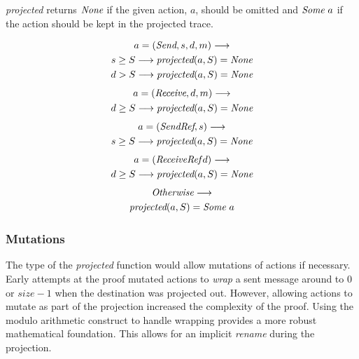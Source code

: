 \documentclass[runningheads]{llncs}
\newcommand{\send}{\emph{Send}}
\newcommand{\receive}{\emph{Receive}}
\newcommand{\sendref}{\emph{SendRef}}
\newcommand{\receiveref}{\emph{ReceiveRef}}
\begin{document}
\emph{projected} returns $\emph{None}$ if the given action, $a$,  should be omitted and $\emph{Some}\ a$ if the action should be kept in the projected trace.

\begin{definition}[projected]
\begin{multline*}
a = (\send, s, d, m) \longrightarrow \\
s \ge S \longrightarrow \emph{projected}(a, S) = \emph{None} \\
d > S \longrightarrow \emph{projected}(a, S) = \emph{None} \\
\end{multline*}
\begin{multline*}
a = (\receive, d, m) \longrightarrow \\
d \ge S \longrightarrow \emph{projected}(a, S) = \emph{None} \\
\end{multline*}
\begin{multline*}
a = (\sendref, s) \longrightarrow \\
s \ge S \longrightarrow \emph{projected}(a, S) = \emph{None} \\
\end{multline*}
\begin{multline*}
a = (\receiveref\, d) \longrightarrow \\
d \ge S \longrightarrow \emph{projected}(a, S) = \emph{None} \\
\end{multline*}
\begin{multline*}
\emph{Otherwise} \longrightarrow \\
\emph{projected}(a, S) = \emph{Some}\ a\\
\end{multline*}
\end{definition}


\subsubsection{Mutations}
The type of the \emph{projected} function would allow mutations of actions if necessary. Early attempts at the proof mutated actions to \emph{wrap} a sent message around to $0$ or $size-1$ when the destination was projected out. However, allowing actions to mutate as part of the projection increased the complexity of the proof. Using the modulo arithmetic construct to handle wrapping provides a more robust mathematical foundation. This allows for an implicit \emph{rename} during the projection. 
\end{document}
